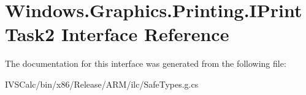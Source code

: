 \hypertarget{interface_windows_1_1_graphics_1_1_printing_1_1_i_print_task2}{}\section{Windows.\+Graphics.\+Printing.\+I\+Print\+Task2 Interface Reference}
\label{interface_windows_1_1_graphics_1_1_printing_1_1_i_print_task2}


The documentation for this interface was generated from the following file\+:\begin{DoxyCompactItemize}
\item 
I\+V\+S\+Calc/bin/x86/\+Release/\+A\+R\+M/ilc/Safe\+Types.\+g.\+cs\end{DoxyCompactItemize}

